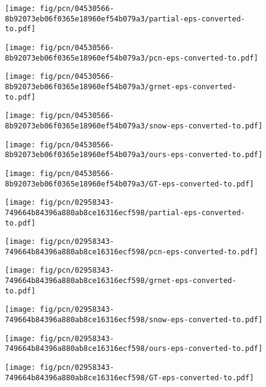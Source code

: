 \begin{figure*}[t]
	\vspace{5pt}
	
	\begin{subfigure}{\sunit}
		\centering
		\texttt{[image: fig/pcn/04530566-8b92073eb06f0365e18960ef54b079a3/partial-eps-converted-to.pdf]}
	\end{subfigure}\hfill \begin{subfigure}{\sunit}
		\centering
		\texttt{[image: fig/pcn/04530566-8b92073eb06f0365e18960ef54b079a3/pcn-eps-converted-to.pdf]}
	\end{subfigure}\hfill \begin{subfigure}{\sunit}
		\centering
		\texttt{[image: fig/pcn/04530566-8b92073eb06f0365e18960ef54b079a3/grnet-eps-converted-to.pdf]}
	\end{subfigure}\hfill \begin{subfigure}{\sunit}
		\centering
		\texttt{[image: fig/pcn/04530566-8b92073eb06f0365e18960ef54b079a3/snow-eps-converted-to.pdf]}
	\end{subfigure}\hfill \begin{subfigure}{\sunit}
		\centering
		\texttt{[image: fig/pcn/04530566-8b92073eb06f0365e18960ef54b079a3/ours-eps-converted-to.pdf]}
	\end{subfigure}\hfill \begin{subfigure}{\sunit}
		\centering
		\texttt{[image: fig/pcn/04530566-8b92073eb06f0365e18960ef54b079a3/GT-eps-converted-to.pdf]}
	\end{subfigure}

	\vspace{5pt}

	\begin{subfigure}{\sunit}
		\centering
		\texttt{[image: fig/pcn/02958343-749664b84396a880ab8ce16316ecf598/partial-eps-converted-to.pdf]}
	\end{subfigure}\hfill \begin{subfigure}{\sunit}
		\centering
		\texttt{[image: fig/pcn/02958343-749664b84396a880ab8ce16316ecf598/pcn-eps-converted-to.pdf]}
	\end{subfigure}\hfill \begin{subfigure}{\sunit}
		\centering
		\texttt{[image: fig/pcn/02958343-749664b84396a880ab8ce16316ecf598/grnet-eps-converted-to.pdf]}
	\end{subfigure}\hfill \begin{subfigure}{\sunit}
		\centering
		\texttt{[image: fig/pcn/02958343-749664b84396a880ab8ce16316ecf598/snow-eps-converted-to.pdf]}
	\end{subfigure}\hfill \begin{subfigure}{\sunit}
		\centering
		\texttt{[image: fig/pcn/02958343-749664b84396a880ab8ce16316ecf598/ours-eps-converted-to.pdf]}
	\end{subfigure}\hfill \begin{subfigure}{\sunit}
		\centering
		\texttt{[image: fig/pcn/02958343-749664b84396a880ab8ce16316ecf598/GT-eps-converted-to.pdf]}
	\end{subfigure}
	

\end{figure*}
